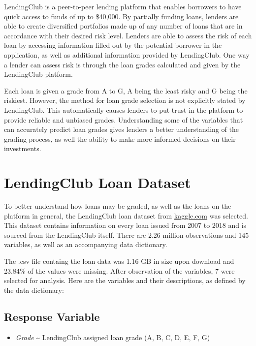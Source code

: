 \documentclass[11pt,]{article}
\providecommand{\tightlist}{%
\setlength{\itemsep}{0pt}\setlength{\parskip}{0pt}}
\begin{document}
LendingClub is a peer-to-peer lending platform that enables borrowers to
have quick access to funds of up to \$40,000. By partially funding
loans, lenders are able to create diversified portfolios made up of any
number of loans that are in accordance with their desired risk level.
Lenders are able to assess the risk of each loan by accessing
information filled out by the potential borrower in the application, as
well as additional information provided by LendingClub. One way a lender
can assess risk is through the loan grades calculated and given by the
LendingClub platform.

Each loan is given a grade from A to G, A being the least risky and G
being the riskiest. However, the method for loan grade selection is not
explicitly stated by LendingClub. This automatically causes lenders to
put trust in the platform to provide reliable and unbiased grades.
Understanding some of the variables that can accurately predict loan
grades gives lenders a better understanding of the grading process, as
well the ability to make more informed decisions on their investments.

\hypertarget{lendingclub-loan-dataset}{%
\section{LendingClub Loan Dataset}\label{lendingclub-loan-dataset}}

To better understand how loans may be graded, as well as the loans on
the platform in general, the LendingClub loan dataset from
\href{https://www.kaggle.com/wendykan/lending-club-loan-data}{kaggle.com}
was selected. This dataset contains information on every loan issued
from 2007 to 2018 and is sourced from the LendingClub itself. There are
2.26 million observations and 145 variables, as well as an accompanying
data dictionary.

The .csv file containg the loan data was 1.16 GB in size upon download
and 23.84\% of the values were missing. After observation of the
variables, 7 were selected for analysis. Here are the variables and
their descriptions, as defined by the data dictionary:

\hypertarget{response-variable}{%
\subsection{\texorpdfstring{\textbf{Response
Variable}}{Response Variable}}\label{response-variable}}

\begin{itemize}
\tightlist
\item
  \emph{Grade} \textasciitilde{} LendingClub assigned loan grade (A, B,
  C, D, E, F, G)
\end{itemize}
\end{document}

